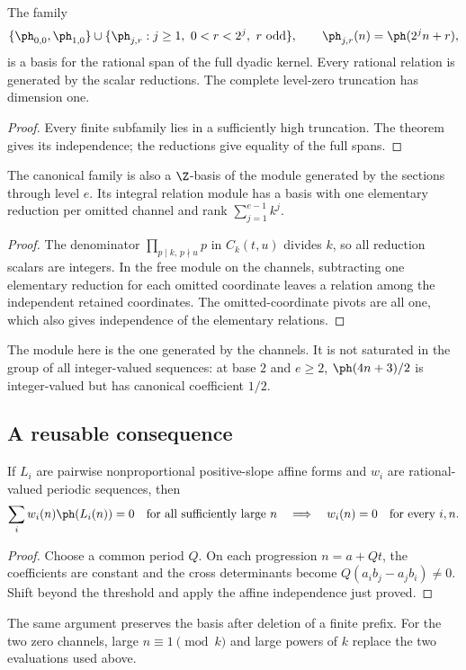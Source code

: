 \begin{corollary}\label{res:basis}
The family
\[
 \{\ph_{0,0},\ph_{1,0}\}
 \cup\{\ph_{j,r}:j\ge1,\ 0<r<2^j,\ r\text{ odd}\},
 \qquad \ph_{j,r}(n)=\ph(2^jn+r),
\]
is a basis for the rational span of the full dyadic kernel. Every rational
relation is generated by the scalar reductions. The complete level-zero
truncation has dimension one.
\end{corollary}
\begin{proof}
Every finite subfamily lies in a sufficiently high truncation. The theorem
gives its independence; the reductions give equality of the full spans.
\end{proof}

\begin{corollary}\label{cor:integral-normal-form}
The canonical family is also a $\Z$-basis of the module generated by the
sections through level $e$. Its integral relation module has a basis with
one elementary reduction per omitted channel and rank
$\sum_{j=1}^{e-1}k^j$.
\end{corollary}
\begin{proof}
The denominator $\prod_{p\mid k,\,p\nmid u}p$ in $C_k(t,u)$ divides $k$,
so all reduction scalars are integers. In the free module on the channels,
subtracting one elementary reduction for each omitted coordinate leaves a
relation among the independent retained coordinates. The omitted-coordinate
pivots are all one, which also gives independence of the elementary relations.
\end{proof}
The module here is the one generated by the channels. It is not saturated
in the group of all integer-valued sequences: at base $2$ and $e\ge2$,
$\ph(4n+3)/2$ is integer-valued but has canonical coefficient $1/2$.

\subsection{A reusable consequence}
\begin{corollary}\label{cor:periodic-freezing}
If $L_i$ are pairwise nonproportional positive-slope affine forms and $w_i$
are rational-valued periodic sequences, then
\[
 \sum_i w_i(n)\ph(L_i(n))=0\quad\text{for all sufficiently large }n
 \quad\Longrightarrow\quad w_i(n)=0\quad\text{for every }i,n.
\]
\end{corollary}
\begin{proof}
Choose a common period $Q$. On each progression $n=a+Qt$, the coefficients
are constant and the cross determinants become $Q(a_ib_j-a_jb_i)\ne0$.
Shift beyond the threshold and apply the affine independence just proved.
\end{proof}
The same argument preserves the basis after deletion of a finite prefix.
For the two zero channels, large $n\equiv1\pmod k$ and large powers of $k$
replace the two evaluations used above.
